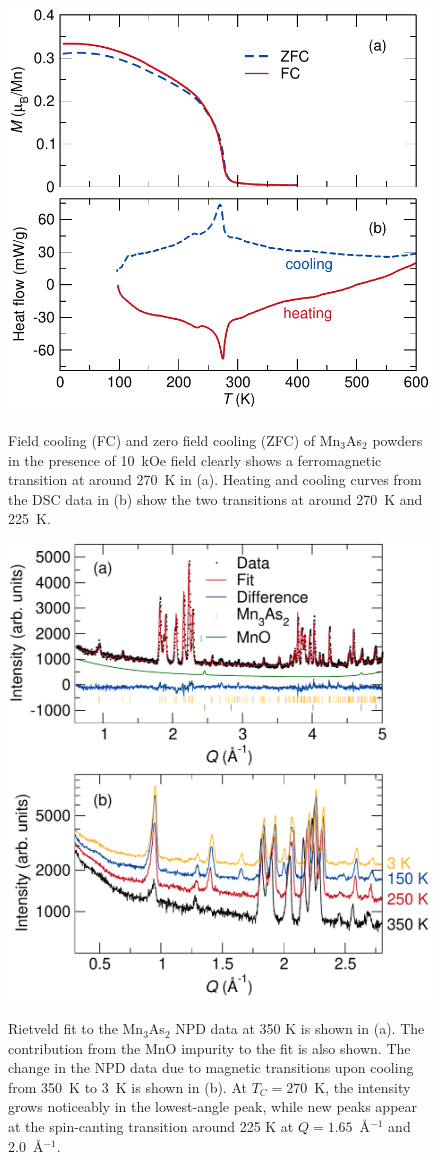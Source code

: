 \documentclass[letterpaper,10pt,doublespacing,edeposit]{uiucthesis2020}
\begin{document}
\begin{mainmatter}
\begin{figure}
\centering\includegraphics[width=0.75\columnwidth]{figures/ch6/FC_ZFC_DSC_Mn3As2_cropped.pdf} \\
\caption{Field cooling (FC) and zero field cooling (ZFC) of Mn$_3$As$_2$ powders in the presence of 10~kOe field clearly shows a ferromagnetic transition at around 270~K in (a). Heating and cooling curves from the DSC data in (b) show the two transitions at around 270~K and 225~K.
}
\label{fig:DSC_SQUID_measurement}
\end{figure}

\begin{figure}
\centering\includegraphics[width=0.75\columnwidth]{figures/ch6/350K_rietveld_diff_temp_NPD_cropped.pdf} \\
\caption{Rietveld fit to the Mn$_3$As$_2$ NPD data at 350 K is shown in (a). The contribution from the MnO impurity to the fit is also shown. The change in the NPD data due to magnetic transitions upon cooling from 350~K to 3~K is shown in (b). At $T_C = 270$~K, the intensity grows noticeably in the lowest-angle peak, while new peaks appear at the spin-canting transition around 225 K at $Q = 1.65$~\AA$^{-1}$ and 2.0~\AA$^{-1}$.
}
\label{fig:350K_data}
\end{figure}



\end{mainmatter}
\end{document}
